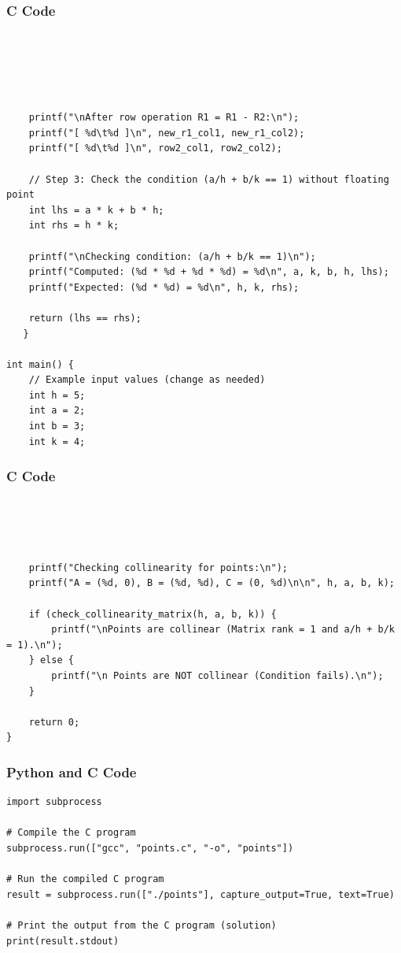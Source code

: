 \documentclass{beamer}
\begin{document}
\begin{frame}[fragile]
\frametitle{C Code}
\begin{lstlisting}
    

    


    printf("\nAfter row operation R1 = R1 - R2:\n");
    printf("[ %d\t%d ]\n", new_r1_col1, new_r1_col2);
    printf("[ %d\t%d ]\n", row2_col1, row2_col2);

    // Step 3: Check the condition (a/h + b/k == 1) without floating point
    int lhs = a * k + b * h;
    int rhs = h * k;

    printf("\nChecking condition: (a/h + b/k == 1)\n");
    printf("Computed: (%d * %d + %d * %d) = %d\n", a, k, b, h, lhs);
    printf("Expected: (%d * %d) = %d\n", h, k, rhs);

    return (lhs == rhs);
   }

int main() {
    // Example input values (change as needed)
    int h = 5;
    int a = 2;
    int b = 3;
    int k = 4;
\end{lstlisting}
\end{frame}
\begin{frame}[fragile]
\frametitle{C Code}
\begin{lstlisting}
    



    printf("Checking collinearity for points:\n");
    printf("A = (%d, 0), B = (%d, %d), C = (0, %d)\n\n", h, a, b, k);

    if (check_collinearity_matrix(h, a, b, k)) {
        printf("\nPoints are collinear (Matrix rank = 1 and a/h + b/k = 1).\n");
    } else {
        printf("\n Points are NOT collinear (Condition fails).\n");
    }

    return 0;
}
\end{lstlisting}
    
\end{frame}



\begin{frame}[fragile]
\frametitle{Python and C Code}

\begin{lstlisting}
import subprocess

# Compile the C program
subprocess.run(["gcc", "points.c", "-o", "points"])

# Run the compiled C program
result = subprocess.run(["./points"], capture_output=True, text=True)

# Print the output from the C program (solution)
print(result.stdout) 

\end{lstlisting}

\end{frame}

 
\end{document}
